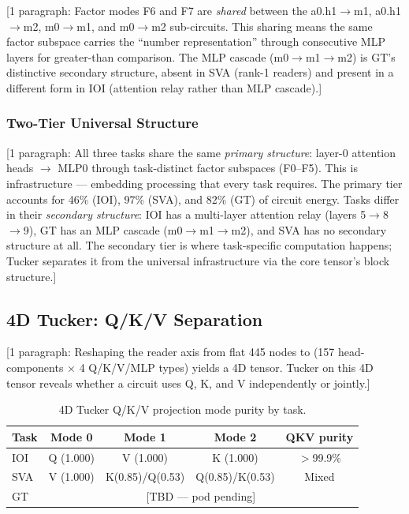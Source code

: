 \documentclass[11pt]{article}
\begin{document}
[1 paragraph: Factor modes F6 and F7 are \emph{shared} between the
a0.h1$\to$m1, a0.h1$\to$m2, m0$\to$m1, and m0$\to$m2 sub-circuits.
This sharing means the same factor subspace carries the ``number
representation'' through consecutive MLP layers for greater-than
comparison. The MLP cascade (m0$\to$m1$\to$m2) is GT's distinctive
secondary structure, absent in SVA (rank-1 readers) and present in
a different form in IOI (attention relay rather than MLP cascade).]

\subsubsection{Two-Tier Universal Structure}


[1 paragraph: All three tasks share the same \emph{primary structure}:
layer-0 attention heads $\to$ MLP0 through task-distinct factor
subspaces (F0--F5). This is infrastructure --- embedding processing
that every task requires. The primary tier accounts for 46\% (IOI),
97\% (SVA), and 82\% (GT) of circuit energy. Tasks differ in their
\emph{secondary structure}: IOI has a multi-layer attention relay
(layers 5$\to$8$\to$9), GT has an MLP cascade (m0$\to$m1$\to$m2),
and SVA has no secondary structure at all. The secondary tier is where
task-specific computation happens; Tucker separates it from the
universal infrastructure via the core tensor's block structure.]


\subsection{4D Tucker: Q/K/V Separation}
\label{app:tucker_4d}


[1 paragraph: Reshaping the reader axis from flat 445 nodes to
(157 head-components $\times$ 4 Q/K/V/MLP types) yields a 4D tensor.
Tucker on this 4D tensor reveals whether a circuit uses Q, K, and V
independently or jointly.]

\begin{table}[h]
\centering
\caption{4D Tucker Q/K/V projection mode purity by task.}
\label{tab:tucker_4d_purity}
\begin{tabular}{lcccc}
\toprule
\textbf{Task} & \textbf{Mode 0} & \textbf{Mode 1} & \textbf{Mode 2} & \textbf{QKV purity} \\
\midrule
IOI & Q (1.000) & V (1.000) & K (1.000) & $>$99.9\% \\
SVA & V (1.000) & K(0.85)/Q(0.53) & Q(0.85)/K(0.53) & Mixed \\
GT  & \multicolumn{4}{c}{[TBD --- pod pending]} \\
\bottomrule
\end{tabular}
\end{table}
\end{document}
